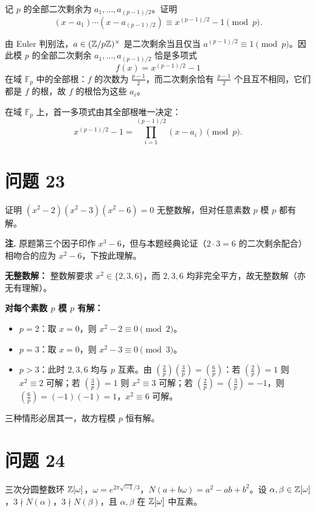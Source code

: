 \documentclass{article}
\newcommand{\leg}[2]{\left(\frac{#1}{#2}\right)}
\begin{document}
记 $p$ 的全部二次剩余为 $a_1,\dots,a_{(p-1)/2}$。证明
\[
  (x-a_1)\cdots(x-a_{(p-1)/2})\equiv x^{(p-1)/2}-1\pmod p .
\]

\begin{solution}
  由 Euler 判别法，$a\in(\mathbb{Z}/p\mathbb{Z})^\times$ 是二次剩余当且仅当 $a^{(p-1)/2}\equiv1\pmod p$。因此模 $p$ 的全部二次剩余 $a_1,\dots,a_{(p-1)/2}$ 恰是多项式
  \[
    f(x)=x^{(p-1)/2}-1
  \]
  在域 $\mathbb F_p$ 中的全部根：$f$ 的次数为 $\tfrac{p-1}2$，而二次剩余恰有 $\tfrac{p-1}2$ 个且互不相同，它们都是 $f$ 的根，故 $f$ 的根恰为这些 $a_i$。

  在域 $\mathbb F_p$ 上，首一多项式由其全部根唯一决定：
  \[
    x^{(p-1)/2}-1=\prod_{i=1}^{(p-1)/2}(x-a_i)\pmod p .
  \]
\end{solution}

\section{问题 23}

证明 $(x^2-2)(x^2-3)(x^2-6)=0$ 无整数解，但对任意素数 $p$ 模 $p$ 都有解。

\begin{solution}
  \textbf{注.} 原题第三个因子印作 $x^3-6$，但与本题经典论证（$2\cdot3=6$ 的二次剩余配合）相吻合的应为 $x^2-6$，下按此理解。

  \textbf{无整数解：} 整数解要求 $x^2\in\{2,3,6\}$，而 $2,3,6$ 均非完全平方，故无整数解（亦无有理解）。

  \textbf{对每个素数 $p$ 模 $p$ 有解：}
  \begin{itemize}
    \item $p=2$：取 $x=0$，则 $x^2-2\equiv0\pmod2$。
    \item $p=3$：取 $x=0$，则 $x^2-3\equiv0\pmod3$。
    \item $p>3$：此时 $2,3,6$ 均与 $p$ 互素。由 $\leg2p\leg3p=\leg6p$：若 $\leg2p=1$ 则 $x^2\equiv2$ 可解；若 $\leg3p=1$ 则 $x^2\equiv3$ 可解；若 $\leg2p=\leg3p=-1$，则 $\leg6p=(-1)(-1)=1$，$x^2\equiv6$ 可解。
  \end{itemize}
  三种情形必居其一，故方程模 $p$ 恒有解。
\end{solution}

\section{问题 24}

三次分圆整数环 $\mathbb{Z}[\omega]$，$\omega=e^{2\pi\sqrt{-1}/3}$，$N(a+b\omega)=a^2-ab+b^2$。设 $\alpha,\beta\in\mathbb{Z}[\omega]$，$3\nmid N(\alpha)$，$3\nmid N(\beta)$，且 $\alpha,\beta$ 在 $\mathbb{Z}[\omega]$ 中互素。
\end{document}

